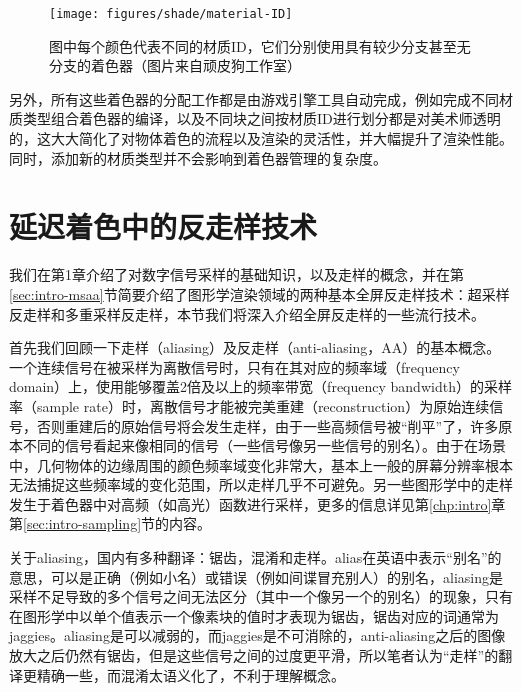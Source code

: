 \begin{figure}
	\texttt{[image: figures/shade/material-ID]}
	\caption{图中每个颜色代表不同的材质ID，它们分别使用具有较少分支甚至无分支的着色器（图片来自顽皮狗工作室）}
	\label{f:shade-material-ID}
\end{figure}

另外，所有这些着色器的分配工作都是由游戏引擎工具自动完成，例如完成不同材质类型组合着色器的编译，以及不同块之间按材质ID进行划分都是对美术师透明的，这大大简化了对物体着色的流程以及渲染的灵活性，并大幅提升了渲染性能。同时，添加新的材质类型并不会影响到着色器管理的复杂度。





\section{延迟着色中的反走样技术}\label{sec:shade-anti-aliasing}
我们在第1章介绍了对数字信号采样的基础知识，以及走样的概念，并在第\ref{sec:intro-msaa}节简要介绍了图形学渲染领域的两种基本全屏反走样技术：超采样反走样和多重采样反走样，本节我们将深入介绍全屏反走样的一些流行技术。

首先我们回顾一下走样（aliasing）及反走样（anti-aliasing，AA）的基本概念。一个连续信号在被采样为离散信号时，只有在其对应的频率域（frequency domain）上，使用能够覆盖2倍及以上的频率带宽（frequency bandwidth）的采样率（sample rate）时，离散信号才能被完美重建（reconstruction）为原始连续信号，否则重建后的原始信号将会发生走样，由于一些高频信号被“削平”了，许多原本不同的信号看起来像相同的信号（一些信号像另一些信号的别名）。由于在场景中，几何物体的边缘周围的颜色频率域变化非常大，基本上一般的屏幕分辨率根本无法捕捉这些频率域的变化范围，所以走样几乎不可避免。另一些图形学中的走样发生于着色器中对高频（如高光）函数进行采样，更多的信息详见第\ref{chp:intro}章第\ref{sec:intro-sampling}节的内容。

\begin{shaded*}
	关于aliasing，国内有多种翻译：锯齿，混淆和走样。alias在英语中表示“别名”的意思，可以是正确（例如小名）或错误（例如间谍冒充别人）的别名，aliasing是采样不足导致的多个信号之间无法区分（其中一个像另一个的别名）的现象，只有在图形学中以单个值表示一个像素块的值时才表现为锯齿，锯齿对应的词通常为jaggies。aliasing是可以减弱的，而jaggies是不可消除的，anti-aliasing之后的图像放大之后仍然有锯齿，但是这些信号之间的过度更平滑，所以笔者认为“走样”的翻译更精确一些，而混淆太语义化了，不利于理解概念。
\end{shaded*}

